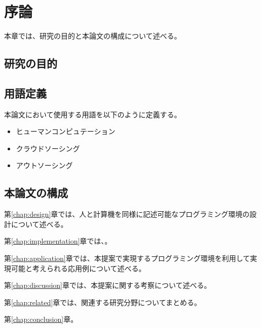 \chapter{序論}
\label{chap:introduction}

本章では、研究の目的と本論文の構成について述べる。

\section{研究の目的}\label{ux7814ux7a76ux306eux76eeux7684}

\section{用語定義}\label{ux7528ux8a9eux5b9aux7fa9}

本論文において使用する用語を以下のように定義する。

\begin{itemize}
\itemsep1pt\parskip0pt
\item
  ヒューマンコンピュテーション
\item
  クラウドソーシング
\item
  アウトソーシング
\end{itemize}

\section{本論文の構成}\label{ux672cux8ad6ux6587ux306eux69cbux6210}

第\ref{chap:design}章では、人と計算機を同様に記述可能なプログラミング環境の設計について述べる。

第\ref{chap:implementation}章では、。

第\ref{chap:application}章では、本提案で実現するプログラミング環境を利用して実現可能と考えられる応用例について述べる。

第\ref{chap:discussion}章では、本提案に関する考察について述べる。

第\ref{chap:related}章では、関連する研究分野についてまとめる。

第\ref{chap:conclusion}章。
